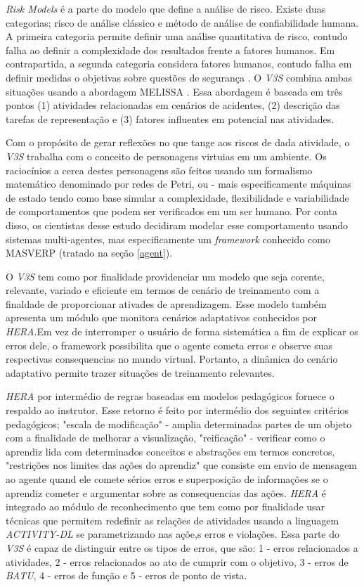 \textit{Risk Models} é a parte do modelo que define a análise de risco. Existe duas categorias; risco de análise clássico e método de análise de confiabilidade
humana. A primeira categoria permite definir uma análise quantitativa de risco, contudo falha ao definir a complexidade dos resultados frente a fatores humanos. 
Em contrapartida, a segunda categoria considera fatores humanos, contudo falha em definir medidas o objetivas sobre questões de segurança \cite{v3sframework}.
O \textit{V3S} combina ambas situações usando a abordagem MELISSA \cite{melissaproject} \cite{v3sframework}. Essa abordagem é baseada em três pontos (1) 
atividades relacionadas em cenários de acidentes, (2) descrição das tarefas de representação e (3) fatores influentes em potencial nas atividades. 

Com o propósito de gerar reflexões no que tange aos riscos de dada atividade, o \textit{V3S} trabalha com o conceito de personagens virtuias em um ambiente. Os raciocínios a cerca destes personagens são feitos usando um 
formalismo matemático denominado por redes de Petri, ou - mais especificamente máquinas de estado \cite{v3sframework} tendo como base simular a complexidade, flexibilidade 
e variabilidade de comportamentos que podem ser verificados em um ser humano. Por conta disso, os cientistas desse estudo decidiram modelar esse comportamento usando 
sistemas multi-agentes, mas especificamente um \textit{framework} conhecido como MASVERP (tratado na seção \ref{agent}).

O \textit{V3S} tem como por finalidade providenciar um modelo que seja corente, relevante, variado e eficiente em termos de cenário de treinamento com a finaldade de proporcionar ativades de aprendizagem. Esse modelo também apresenta um módulo 
que monitora cenários adaptativos conhecidos por \textit{HERA}.Em vez de interromper o usuário de forma sistemática a fim de explicar os erros dele, o framework possibilita que o agente cometa erros e observe suas respectivas consequencias 
no mundo virtual. Portanto, a dinâmica do cenário adaptativo permite trazer situações de treinamento relevantes. 

\textit{HERA} por intermédio de regras baseadas em modelos pedagógicos fornece o respaldo ao instrutor. Esse retorno é feito por intermédio dos seguintes critérios pedagógicos; "escala de modificação" - amplia determinadas partes de um objeto 
com a finalidade de melhorar a visualização, "reificação" - verificar como o aprendiz lida com determinados conceitos e abstrações em termos concretos, "restrições nos limites das ações do aprendiz" que consiste em envio de mensagem ao agente 
quand ele comete sérios erros e superposição de informações se o aprendiz cometer e argumentar sobre as consequencias das ações. \textit{HERA} é integrado ao módulo de reconhecimento que tem como por finalidade usar técnicas que permitem 
redefinir as relações de atividades usando a linguagem \textit{ACTIVITY-DL} se parametrizando nas açõe,s erros e violações. Essa parte do \textit{V3S} é capaz de distinguir entre os tipos de erros, que são: 1 - erros relacionados a atividades,
2 - erros relacionados ao ato de cumprir com o objetivo, 3 - erros de \textit{BATU}, 4 - erros de função e 5 - erros de ponto de vista. 
	